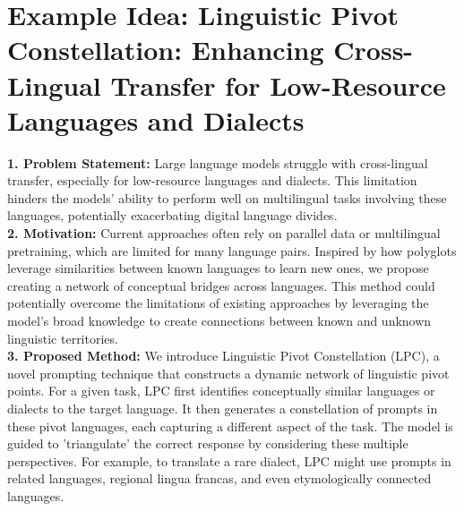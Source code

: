 



\newpage 



\section{Example Idea: Linguistic Pivot Constellation: Enhancing Cross-Lingual Transfer for Low-Resource Languages and Dialects}
\label{sec:example_4}


\begin{tcolorbox}[colback=blue!5!white,colframe=blue!75!black,title=\textbf{Linguistic Pivot Constellation (LPC): Enhancing Cross-Lingual Transfer for Low-Resource Languages and Dialects (Part 1)}]
\small 
    \textbf{1. Problem Statement:} Large language models struggle with cross-lingual transfer, especially for low-resource languages and dialects. This limitation hinders the models' ability to perform well on multilingual tasks involving these languages, potentially exacerbating digital language divides.
\\

    \textbf{2. Motivation:} Current approaches often rely on parallel data or multilingual pretraining, which are limited for many language pairs. Inspired by how polyglots leverage similarities between known languages to learn new ones, we propose creating a network of conceptual bridges across languages. This method could potentially overcome the limitations of existing approaches by leveraging the model's broad knowledge to create connections between known and unknown linguistic territories.
\\

    \textbf{3. Proposed Method:} We introduce Linguistic Pivot Constellation (LPC), a novel prompting technique that constructs a dynamic network of linguistic pivot points. For a given task, LPC first identifies conceptually similar languages or dialects to the target language. It then generates a constellation of prompts in these pivot languages, each capturing a different aspect of the task. The model is guided to 'triangulate' the correct response by considering these multiple perspectives. For example, to translate a rare dialect, LPC might use prompts in related languages, regional lingua francas, and even etymologically connected languages.
\\


\end{tcolorbox}
